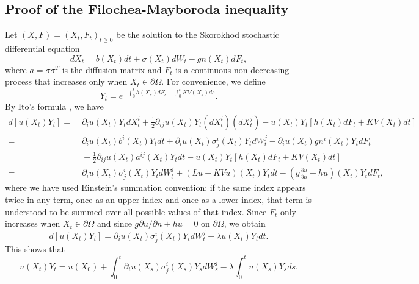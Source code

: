\documentclass[a4paper,11pt]{article}
\begin{document}
\begin{appendices}

\section{Proof of the Filochea-Mayboroda inequality}\label{appA}
Let $(X, F) = (X_t,F_t)_{t\geq 0}$ be the solution to the Skorokhod stochastic differential equation
\begin{equation*}
d X_t = b(X_t) dt + \sigma(X_t) d W_t - g n(X_t) d F_t,
\end{equation*}
where $a = \sigma\sigma^T$ is the diffusion matrix and $F_t$ is a continuous non-decreasing process that increases only when $X_t \in \partial \Omega$. For convenience, we define
\begin{equation*}
Y_t = e^{-\int_{0}^{t} h(X_s) d F_s - \int_{0}^{t} K V(X_s) ds}.
\end{equation*}
By Ito's formula \cite{protter2005stochastic}, we have
\begin{equation*}
\begin{split}
d[u(X_t) Y_t] = &\; \partial_i u(X_t) Y_t dX^i_t + \frac{1}{2} \partial_{ij} u(X_t) Y_t (dX^i_t) (dX^j_t) - u(X_t) Y_t [h(X_t) dF_t + K V(X_t) dt] \\
= &\; \partial_i u(X_t) b^i(X_t) Y_t dt + \partial_i u(X_t) \sigma^i_j(X_t) Y_t dW^j_t - \partial_i u(X_t) g n^i(X_t) Y_t dF_t\\
&\; + \frac{1}{2} \partial_{ij} u(X_t) a^{ij}(X_t) Y_t dt - u(X_t) Y_t [h(X_t) dF_t + K V(X_t) dt]\\
= &\; \partial_i u(X_t) \sigma^i_j(X_t) Y_t dW^j_t + (L u - K V u) (X_t) Y_t dt
- \left( g \frac{\partial u}{\partial n} + h u \right) (X_t) Y_t dF_t,
\end{split}
\end{equation*}
where we have used Einstein's summation convention: if the same index appears twice in any term, once as an upper index and once as a lower index, that term is understood to be summed over all possible values of that index. Since $F_t$ only increases when $X_t \in \partial \Omega$ and since $g \partial u/\partial n + h u = 0$ on $\partial \Omega$, we obtain
\begin{equation*}
d[u(X_t) Y_t] = \partial_i u(X_t) \sigma^i_j(X_t) Y_t dW^j_t - \lambda u(X_t) Y_tdt.
\end{equation*}
This shows that
\begin{equation*}
u(X_t)Y_t = u(X_0) + \int_0^t \partial_i u(X_s) \sigma^i_j(X_s) Y_s dW^j_s - \lambda \int_0^t u(X_s) Y_s ds.

\end{equation*}
\end{appendices}
\end{document}

